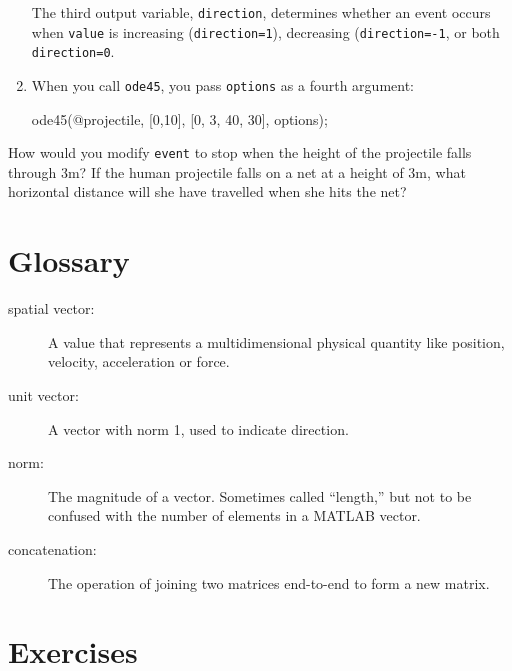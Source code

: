 \documentclass[
]{book}
\numberwithin{Answer}{chapter}
\numberwithin{Exercise}{chapter}
\begin{document}
\begin{enumerate}
The third output variable, {\tt direction}, determines whether an event
        occurs when {\tt value} is increasing ({\tt direction=1}),
        decreasing ({\tt direction=-1}, or both {\tt direction=0}.



\item When you call {\tt ode45}, you pass {\tt options} as a fourth
argument:

\begin{code}
ode45(@projectile, [0,10], [0, 3, 40, 30], options);
\end{code}
%
\end{enumerate}

\begin{ex}
How would you modify {\tt event} to stop when the height of
the projectile falls through 3m?
If the human projectile falls on a net at a height of 3m, what
horizontal distance will she have travelled when she hits the
net?
\end{ex}

\section{Glossary}

\begin{description}

\item[spatial vector:] A value that represents a
multidimensional physical quantity like position, velocity,
acceleration or force.

\item[unit vector:] A vector with norm 1, used to indicate
direction.

\item[norm:] The magnitude of a vector.  Sometimes called ``length,''
but not to be confused with the number of elements in a MATLAB
vector.
\item[concatenation:] The operation of joining two matrices end-to-end to
form a new matrix.


\end{description}

\section{Exercises}
\end{document}

